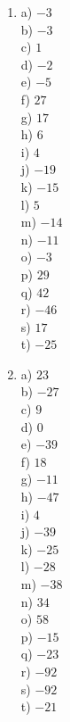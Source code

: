 \documentclass{exam}
\begin{document}
\begin{multicols*}{4}
\begin{enumerate}
\item 	a) $-3$ \\
		b) $-3$ \\
		c) $1$ \\
		d) $-2$ \\
		e) $-5$ \\
		f) $27$ \\
		g) $17$ \\
		h) $6$ \\
		i) $4$ \\
		j) $-19$ \\
		k) $-15$ \\
		l) $5$ \\
		m) $-14$ \\
		n) $-11$ \\
		o) $-3$ \\
		p) $29$ \\
		q) $42$ \\
		r) $-46$ \\
		s) $17$ \\
		t) $-25$ \\


\item 	a) $23$ \\
		b) $-27$ \\
		c) $9$ \\
		d) $0$ \\
		e) $-39$ \\
		f) $18$ \\
		g) $-11$ \\
		h) $-47$ \\
		i) $4$ \\
		j) $-39$ \\
		k) $-25$ \\
		l) $-28$ \\
		m) $-38$ \\
		n) $34$ \\
		o) $58$ \\
		p) $-15$ \\
		q) $-23$ \\
		r) $-92$ \\
		s) $-92$ \\
		t) $-21$ \\



\end{enumerate}
\end{multicols*}
\end{document}
